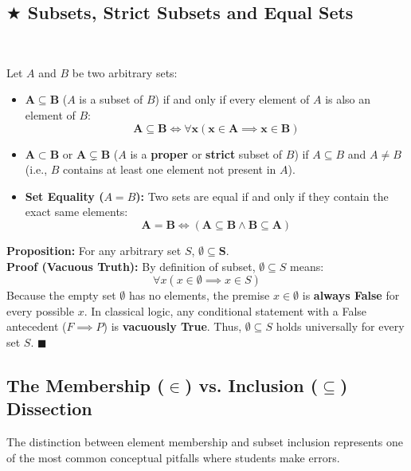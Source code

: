 \documentclass[11pt,a4paper]{article}
\begin{document}
\subsection{\texorpdfstring{$\bigstar$ }{*}Subsets, Strict Subsets and Equal Sets}
\\[3pt]
\begin{defbox}
Let $A$ and $B$ be two arbitrary sets:
\begin{itemize}
    \item $\mathbf{A \subseteq B}$ ($A$ is a subset of $B$) if and only if every element of $A$ is also an element of $B$:
    \[
    \mathbf{A \subseteq B \iff \forall x (x \in A \implies x \in B)}
    \]
    \item $\mathbf{A \subset B}$ or $\mathbf{A \subsetneq B}$ ($A$ is a \textbf{proper} or \textbf{strict} subset of $B$) if $A \subseteq B$ and $A \neq B$ (i.e., $B$ contains at least one element not present in $A$).
    \item \textbf{Set Equality ($A = B$):} Two sets are equal if and only if they contain the exact same elements:
    \[
    \mathbf{A = B \iff (A \subseteq B \land B \subseteq A)}
    \]
\end{itemize}
\end{defbox}

\begin{theorembox}
\textbf{Proposition:} For any arbitrary set $S$, $\mathbf{\emptyset \subseteq S}$.\\
\textbf{Proof (Vacuous Truth):}
By definition of subset, $\emptyset \subseteq S$ means:
\[
\forall x (x \in \emptyset \implies x \in S)
\]
Because the empty set $\emptyset$ has no elements, the premise $x \in \emptyset$ is \textbf{always False} for every possible $x$. In classical logic, any conditional statement with a False antecedent ($F \implies P$) is \textbf{vacuously True}. Thus, $\emptyset \subseteq S$ holds universally for every set $S$. $\blacksquare$
\end{theorembox}

\subsection{The Membership (\texorpdfstring{$\in$}{in}) vs. Inclusion (\texorpdfstring{$\subseteq$}{subset}) Dissection}
The distinction between element membership and subset inclusion represents one of the most common conceptual pitfalls where students make errors.
\end{document}
